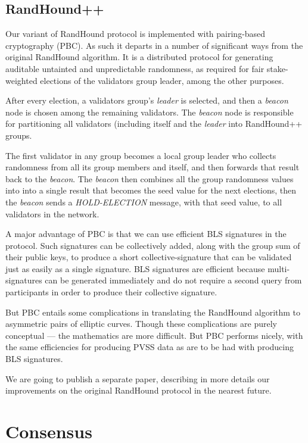 \documentclass[a4paper, 10pt, conference]{ieeeconf}
\begin{document}
\subsection{RandHound++}

Our variant of RandHound protocol is implemented with pairing-based cryptography (PBC). As such it departs in a number of significant ways from the original RandHound algorithm. It is a distributed protocol for generating audit\-able untainted and unpredictable randomness, as required for fair stake-weighted elections of the validators group leader, among the other purposes.

After every election, a validators group's \textit{leader} is selected, and then a \textit{beacon} node is chosen among the remaining validators. The \textit{beacon} node is responsible for partitioning all validators (including itself and the \textit{leader} into RandHound++ groups. 

The first validator in any group becomes a local group leader who collects randomness from all its group members and itself, and then forwards that result back to the \textit{beacon}. The \textit{beacon} then combines all the group randomness values into into a single result that becomes the seed value for the next elections, then the \textit{beacon} sends a \textit{HOLD-ELECTION} message, with that seed value, to all validators in the network.

A major advantage of PBC is that we can use efficient BLS signatures\cite{c16} in the protocol. Such signatures can be collectively added, along with the group sum of their public keys, to produce a short collective-signature that can be validated just as easily as a single signature. BLS signatures are efficient because multi-signatures can be generated immediately and do not require a second query from participants in order to produce their collective signature.

But PBC entails some complications in translating the RandHound algorithm to asymmetric pairs of elliptic curves. Though these complications are purely conceptual --- the mathematics are more difficult. But PBC performs nicely, with the same efficiencies for producing PVSS data as are to be had with producing BLS signatures.

We are going to publish a separate paper, describing in more details our improvements on the original RandHound protocol in the nearest future.

\section{Consensus}\label{consensus}
\end{document}
